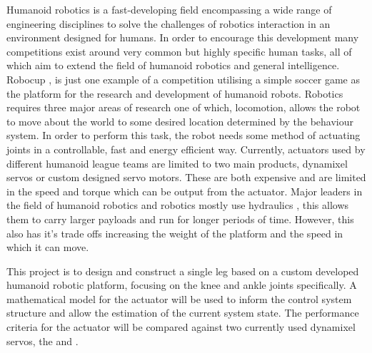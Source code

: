 \documentclass[11pt,a4paper]{article}
\begin{document}
Humanoid robotics is a fast-developing field encompassing a wide range of engineering disciplines to solve the challenges of robotics interaction in an environment designed for humans. In order to encourage this development many competitions exist around very common but highly specific human tasks, all of which aim to extend the field of humanoid robotics and general intelligence. Robocup \cite{kitano1995robocup}, is just one example of a competition utilising a simple soccer game as the platform for the research and development of humanoid robots. Robotics requires three major areas of research one of which, locomotion, allows the robot to move about the world to some desired location determined by the behaviour system. In order to perform this task, the robot needs some method of actuating joints in a controllable, fast and energy efficient way. Currently, actuators used by different humanoid league teams are limited to two main products, dynamixel servos \cite{robotis_mx106} or custom designed servo motors. These are both expensive and are limited in the speed and torque which can be output from the actuator. Major leaders in the field of humanoid robotics and robotics mostly use hydraulics \cite{atlas}, this allows them to carry larger payloads and run for longer periods of time. However, this also has it's trade offs increasing the weight of the platform and the speed in which it can move. \newline

This project is to design and construct a single leg based on a custom developed humanoid robotic platform, focusing on the knee and ankle joints specifically. A mathematical model for the actuator will be used to inform the control system structure and allow the estimation of the current system state. The performance criteria for the actuator will be compared against two currently used dynamixel servos, the \cite{robotis_mx106} and \cite{robotis}.\newline
\end{document}

